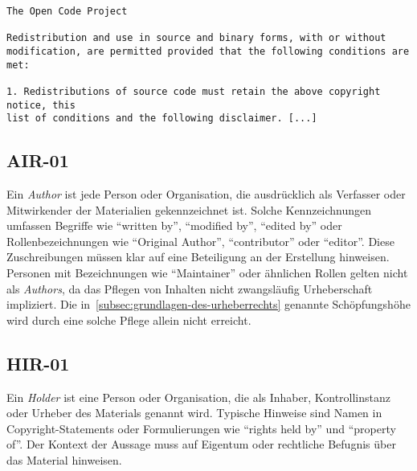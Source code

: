 \begin{lstlisting}[keepspaces=true]
The Open Code Project

Redistribution and use in source and binary forms, with or without
modification, are permitted provided that the following conditions are met:

1. Redistributions of source code must retain the above copyright notice, this
list of conditions and the following disclaimer. [...]
\end{lstlisting}


\subsection{AIR-01}\label{subsec:air-01}

Ein \textit{Author} ist jede Person oder Organisation, die ausdrücklich als Verfasser oder Mitwirkender der Materialien gekennzeichnet ist.
Solche Kennzeichnungen umfassen Begriffe wie \enquote{written by}, \enquote{modified by}, \enquote{edited by} oder Rollenbezeichnungen wie \enquote{Original Author}, \enquote{contributor} oder \enquote{editor}.
Diese Zuschreibungen müssen klar auf eine Beteiligung an der Erstellung hinweisen.
Personen mit Bezeichnungen wie \enquote{Maintainer} oder ähnlichen Rollen gelten nicht als \textit{Authors}, da das Pflegen von Inhalten nicht zwangsläufig Urheberschaft impliziert.
Die in~\ref{subsec:grundlagen-des-urheberrechts} genannte Schöpfungshöhe wird durch eine solche Pflege allein nicht erreicht.


\subsection{HIR-01}\label{subsec:hir-01}

Ein \textit{Holder} ist eine Person oder Organisation, die als Inhaber, Kontrollinstanz oder Urheber des Materials genannt wird.
Typische Hinweise sind Namen in Copyright-Statements oder Formulierungen wie \enquote{rights held by} und \enquote{property of}.
Der Kontext der Aussage muss auf Eigentum oder rechtliche Befugnis über das Material hinweisen.


